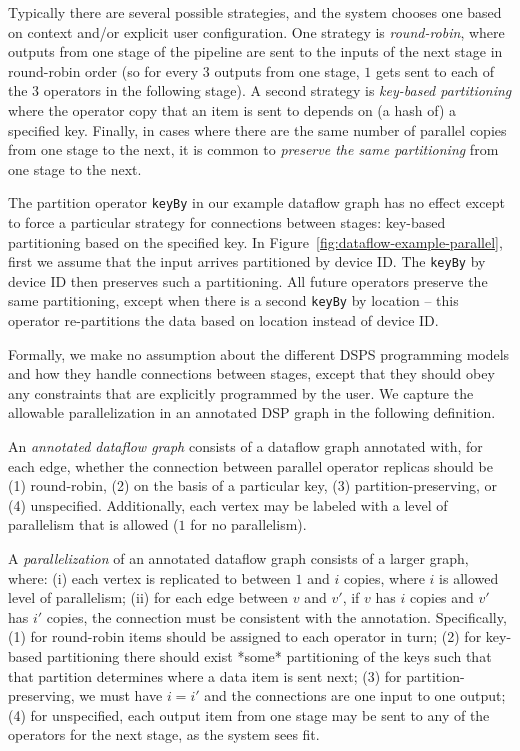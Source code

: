 Typically there are several possible strategies, and the system chooses one based on context and/or explicit user configuration. One strategy is \emph{round-robin}, where outputs from one stage of the pipeline are sent to the inputs of the next stage in round-robin order (so for every $3$ outputs from one stage, $1$ gets sent to each of the $3$ operators in the following stage). A second strategy is \emph{key-based partitioning} where the operator copy that an item is sent to depends on (a hash of) a specified key. Finally, in cases where there are the same number of parallel copies from one stage to the next, it is common to \emph{preserve the same partitioning} from one stage to the next.

The partition operator \texttt{keyBy} in our example dataflow graph has no effect except to force a particular strategy for connections between stages: key-based partitioning based on the specified key.
In Figure~\ref{fig:dataflow-example-parallel}, first we assume that the input arrives partitioned by device ID. The \texttt{keyBy} by device ID then preserves such a partitioning. All future operators preserve the same partitioning, except when there is a second \texttt{keyBy} by location -- this operator re-partitions the data based on location instead of device ID.

Formally, we make no assumption about the different DSPS programming models and how they handle connections between stages, except that they should obey any constraints that are explicitly programmed by the user. We capture the allowable parallelization in an annotated DSP graph in the following definition.

\begin{definition}
\label{def:dataflow-graph-parallelized}
An \emph{annotated dataflow graph} consists of a dataflow graph annotated with, for each edge, whether the connection between parallel operator replicas should be (1) round-robin, (2) on the basis of a particular key, (3) partition-preserving, or (4) unspecified.
Additionally, each vertex may be labeled with a level of parallelism that is allowed ($1$ for no parallelism).

A \emph{parallelization} of an annotated dataflow graph consists of a larger graph, where:
(i) each vertex is replicated to between $1$ and $i$ copies, where $i$ is allowed level of parallelism; (ii) for each edge between $v$ and $v'$, if $v$ has $i$ copies and $v'$ has $i'$ copies, the connection must be consistent with the annotation. Specifically, (1) for round-robin items should be assigned to each operator in turn; (2) for key-based partitioning there should exist *some* partitioning of the keys such that that partition determines where a data item is sent next; (3) for partition-preserving, we must have $i = i'$ and the connections are one input to one output; (4) for unspecified, each output item from one stage may be sent to any of the operators for the next stage, as the system sees fit.
\end{definition}

